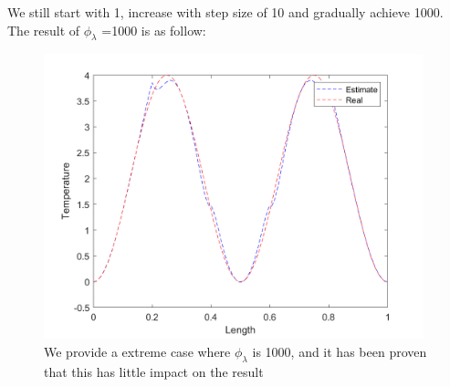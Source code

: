 \documentclass{article}
\begin{document}
We still start with 1, increase with step size of 10 and gradually achieve 1000. The result of $\phi_\lambda$ =1000 is as follow:
 \begin{figure}[H]
        \centering %
        \includegraphics[width=11cm]{pic/phi_lambda=1000.png} %
        \caption{We provide a extreme case where $\phi_\lambda$ is 1000, and it has been proven that this has little impact on the result} %
        \label{phi_l=1000}
    \end{figure} 
\end{document}
